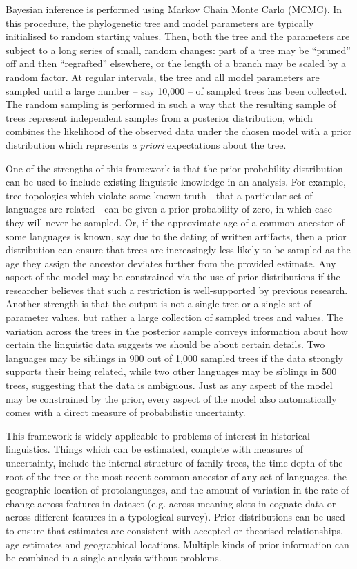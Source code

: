 \documentclass[twocolumn,10pt]{scrartcl}
\begin{document}
Bayesian inference is performed using Markov Chain Monte Carlo (MCMC).  In this procedure, the phylogenetic tree and model parameters are typically initialised to random starting values.  Then, both the tree and the parameters are subject to a long series of small, random changes: part of a tree may be ``pruned'' off and then ``regrafted'' elsewhere, or the length of a branch may be scaled by a random factor.  At regular intervals, the tree and all model parameters are sampled until a large number -- say 10,000 -- of sampled trees has been collected.  The random sampling is performed in such a way that the resulting sample of trees represent independent samples from a posterior distribution, which combines the likelihood of the observed data under the chosen model with a prior distribution which represents \emph{a priori} expectations about the tree.

One of the strengths of this framework is that the prior probability distribution can be used to include existing linguistic knowledge in an analysis.  For example, tree topologies which violate some known truth - that a particular set of languages are related - can be given a prior probability of zero, in which case they will never be sampled.  Or, if the approximate age of a common ancestor of some languages is known, say due to the dating of written artifacts, then a prior distribution can ensure that trees are increasingly less likely to be sampled as the age they assign the ancestor deviates further from the provided estimate.  Any aspect of the model may be constrained via the use of prior distributions if the researcher believes that such a restriction is well-supported by previous research.  Another strength is that the output is not a single tree or a single set of parameter values, but rather a large collection of sampled trees and values.  The variation across the trees in the posterior sample conveys information about how certain the linguistic data suggests we should be about certain details.  Two languages may be siblings in 900 out of 1,000 sampled trees if the data strongly supports their being related, while two other languages may be siblings in 500 trees, suggesting that the data is ambiguous.  Just as any aspect of the model may be constrained by the prior, every aspect of the model also automatically comes with a direct measure of probabilistic uncertainty.

This framework is widely applicable to problems of interest in historical linguistics.  Things which can be estimated, complete with measures of uncertainty, include the internal structure of family trees, the time depth of the root of the tree or the most recent common ancestor of any set of languages, the geographic location of protolanguages, and the amount of variation in the rate of change across features in dataset (e.g. across meaning slots in cognate data or across different features in a typological survey).  Prior distributions can be used to ensure that estimates are consistent with accepted or theorised relationships, age estimates and geographical locations.  Multiple kinds of prior information can be combined in a single analysis without problems.
\end{document}
